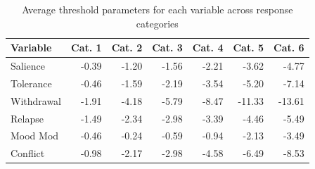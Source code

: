 \begin{table}[H]
\centering
\caption{Average threshold parameters for each variable across response categories} 
\label{tab:thresholds}
\begin{tabular}{lrrrrrr}
  \hline
\textbf{Variable} & \textbf{Cat. 1} & \textbf{Cat. 2} & \textbf{Cat. 3} & \textbf{Cat. 4} & \textbf{Cat. 5} & \textbf{Cat. 6} \\ 
  \hline
Salience & -0.39 & -1.20 & -1.56 & -2.21 & -3.62 & -4.77 \\ 
  Tolerance & -0.46 & -1.59 & -2.19 & -3.54 & -5.20 & -7.14 \\ 
  Withdrawal & -1.91 & -4.18 & -5.79 & -8.47 & -11.33 & -13.61 \\ 
  Relapse & -1.49 & -2.34 & -2.98 & -3.39 & -4.46 & -5.49 \\ 
  Mood Mod & -0.46 & -0.24 & -0.59 & -0.94 & -2.13 & -3.49 \\ 
  Conflict & -0.98 & -2.17 & -2.98 & -4.58 & -6.49 & -8.53 \\ 
   \hline
\end{tabular}
\end{table}
